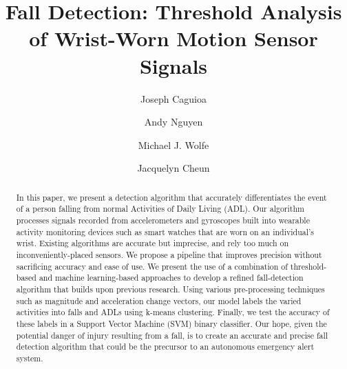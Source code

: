 \documentclass{llncs}
\title{\textbf{Fall Detection: Threshold Analysis of Wrist-Worn Motion Sensor Signals}}
\author{Joseph Caguioa\inst{1}\and Andy Nguyen\inst{1}\and  Michael J. Wolfe\inst{1}\and Jacquelyn Cheun\inst{1}} %
\institute{Master of Science in Data Science, Southern Methodist University, Dallas TX 75275 USA
	      \email{\{jcaguioa, andynguyen, mwolfe, \& jcheun\}@smu.edu} 
	      }
\begin{document}
\maketitle

\begin{abstract}
In this paper, we present a detection algorithm that accurately differentiates the event of a person falling from normal Activities of Daily Living (ADL). Our algorithm processes signals recorded from accelerometers and gyroscopes built into wearable activity monitoring devices such as smart watches that are worn on an individual's wrist. Existing algorithms are accurate but imprecise, and rely too much on inconveniently-placed sensors. We propose a pipeline that improves precision without sacrificing accuracy and ease of use. We present the use of a combination of threshold-based and machine learning-based approaches to develop a refined fall-detection algorithm that builds upon previous research. Using various pre-processing techniques such as magnitude and acceleration change vectors, our model labels the varied activities into falls and ADLs using k-means clustering. Finally, we test the accuracy of these labels in a Support Vector Machine (SVM) binary classifier. Our hope, given the potential danger of injury resulting from a fall, is to create an accurate and precise fall detection algorithm that could be the precursor to an autonomous emergency alert system. 
\end{abstract}


\end{document}
